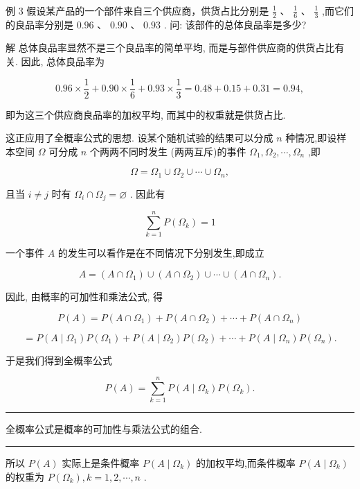 \documentclass[10pt]{article}
\newcommand{\HRule}{\begin{center}\rule{0.9\linewidth}{0.2mm}\end{center}}
\begin{document}
例 3 假设某产品的一个部件来自三个供应商，供货占比分别是 \(\frac{1}{2}\text{ 、 }\frac{1}{6}\text{ 、 }\frac{1}{3}\) ,而它们的良品率分别是 \({0.96}\text{ 、 }{0.90}\text{ 、 }{0.93}\) . 问: 该部件的总体良品率是多少?

解 总体良品率显然不是三个良品率的简单平均, 而是与部件供应商的供货占比有关. 因此, 总体良品率为

\[
{0.96} \times  \frac{1}{2} + {0.90} \times  \frac{1}{6} + {0.93} \times  \frac{1}{3} = {0.48} + {0.15} + {0.31} = {0.94},
\]

即为这三个供应商良品率的加权平均, 而其中的权重就是供货占比.

这正应用了全概率公式的思想. 设某个随机试验的结果可以分成 \(n\) 种情况,即设样本空间 \(\Omega\) 可分成 \(n\) 个两两不同时发生 (两两互斥)的事件 \({\Omega }_{1},{\Omega }_{2},\cdots ,{\Omega }_{n}\) ,即

\[
\Omega  = {\Omega }_{1} \cup  {\Omega }_{2} \cup  \cdots  \cup  {\Omega }_{n},
\]

且当 \(i \neq  j\) 时有 \({\Omega }_{i} \cap  {\Omega }_{j} = \varnothing\) . 因此有

\[
\mathop{\sum }\limits_{{k = 1}}^{n}P\left( {\Omega }_{k}\right)  = 1
\]

一个事件 \(A\) 的发生可以看作是在不同情况下分别发生,即成立

\[
A = \left( {A \cap  {\Omega }_{1}}\right)  \cup  \left( {A \cap  {\Omega }_{2}}\right)  \cup  \cdots  \cup  \left( {A \cap  {\Omega }_{n}}\right) .
\]

因此, 由概率的可加性和乘法公式, 得

\[
P\left( A\right)  = P\left( {A \cap  {\Omega }_{1}}\right)  + P\left( {A \cap  {\Omega }_{2}}\right)  + \cdots  + P\left( {A \cap  {\Omega }_{n}}\right)
\]

\[
= P\left( {A \mid  {\Omega }_{1}}\right) P\left( {\Omega }_{1}\right)  + P\left( {A \mid  {\Omega }_{2}}\right) P\left( {\Omega }_{2}\right)  + \cdots  + P\left( {A \mid  {\Omega }_{n}}\right) P\left( {\Omega }_{n}\right) .
\]

于是我们得到全概率公式

\[
P\left( A\right)  = \mathop{\sum }\limits_{{k = 1}}^{n}P\left( {A \mid  {\Omega }_{k}}\right) P\left( {\Omega }_{k}\right) .
\]

\HRule

全概率公式是概率的可加性与乘法公式的组合.

\HRule

所以 \(P\left( A\right)\) 实际上是条件概率 \(P\left( {A \mid  {\Omega }_{k}}\right)\) 的加权平均,而条件概率 \(P\left( {A \mid  {\Omega }_{k}}\right)\) 的权重为 \(P\left( {\Omega }_{k}\right) ,k = 1,2,\cdots ,n\) .
\end{document}
